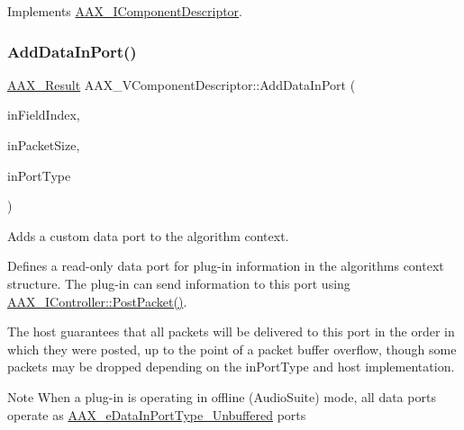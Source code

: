 Implements \mbox{\hyperlink{a01781_a1e0c9508d1eb0c9a60a87a0fb69f1dbe}{A\+A\+X\+\_\+\+I\+Component\+Descriptor}}.

\mbox{\label{a01901_a1b2c3ae4de896e0f47a771ad8b1b5d08}} 
\subsubsection{\texorpdfstring{AddDataInPort()}{AddDataInPort()}}
{\footnotesize\ttfamily \mbox{\hyperlink{a00392_a4d8f69a697df7f70c3a8e9b8ee130d2f}{A\+A\+X\+\_\+\+Result}} A\+A\+X\+\_\+\+V\+Component\+Descriptor\+::\+Add\+Data\+In\+Port (\begin{DoxyParamCaption}\item[{\mbox{\hyperlink{a00392_ae807f8986143820cfb5d6da32165c9c7}{A\+A\+X\+\_\+\+C\+Field\+Index}}}]{in\+Field\+Index,  }\item[{uint32\+\_\+t}]{in\+Packet\+Size,  }\item[{\mbox{\hyperlink{a00491_ab5677b173ad8647c24d34d28272d11fc}{A\+A\+X\+\_\+\+E\+Data\+In\+Port\+Type}}}]{in\+Port\+Type }\end{DoxyParamCaption})\hspace{0.3cm}{\ttfamily [virtual]}}



Adds a custom data port to the algorithm context. 

Defines a read-\/only data port for plug-\/in information in the algorithm\textquotesingle{}s context structure. The plug-\/in can send information to this port using \mbox{\hyperlink{a01789_ae5dd2b5925dbc181513bca1c4ac5e716}{A\+A\+X\+\_\+\+I\+Controller\+::\+Post\+Packet()}}.

The host guarantees that all packets will be delivered to this port in the order in which they were posted, up to the point of a packet buffer overflow, though some packets may be dropped depending on the {\ttfamily in\+Port\+Type} and host implementation.

\begin{DoxyNote}{Note}
When a plug-\/in is operating in offline (Audio\+Suite) mode, all data ports operate as \mbox{\hyperlink{a00491_ab5677b173ad8647c24d34d28272d11fca43dc59a68b369ee607f70700bfd02c2d}{A\+A\+X\+\_\+e\+Data\+In\+Port\+Type\+\_\+\+Unbuffered}} ports
\end{DoxyNote}

